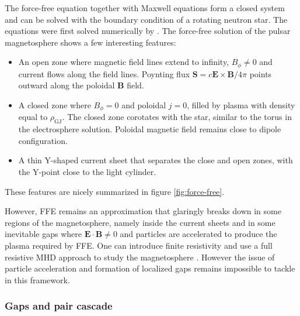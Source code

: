 The force-free equation together with Maxwell equations form a closed system
and can be solved with the boundary condition of a rotating neutron star. The
equations were first solved numerically by \citet{contopoulos_axisymmetric_1999}
\citetext{see also e.g.\ \citealp{goodwin_idealized_2004};
  \citealp{gruzinov_power_2005}; \citealp{timokhin_force-free_2006};
  \citealp{parfrey_introducing_2012}}. The force-free solution of the pulsar
magnetosphere shows a few interesting features:
\begin{itemize}
\item An open zone where magnetic field lines extend to infinity, $B_{\phi}\neq
  0$ and current flows along the field lines. Poynting flux $\mathbf{S} =
  c\mathbf{E}\times \mathbf{B}/4\pi$ points outward along the poloidal $\mathbf{B}$
  field.
\item A closed zone where $B_{\phi} = 0$ and poloidal $j=0$, filled by plasma
  with density equal to $\rho_\mathrm{GJ}$. The closed zone corotates with the
  star, similar to the torus in the electrosphere solution. Poloidal magnetic
  field remains close to dipole configuration.
\item A thin Y-shaped current sheet that separates the close and open zones,
  with the Y-point close to the light cylinder.
\end{itemize}
These features are nicely summarized in figure \ref{fig:force-free}.


However, FFE remains an approximation that glaringly breaks down in some regions
of the magnetosphere, namely inside the current sheets and in some inevitable
gaps where $\mathbf{E}\cdot \mathbf{B} \neq 0$ and particles are accelerated to
produce the plasma required by FFE. One can introduce finite resistivity and use
a full resistive MHD approach to study the magnetosphere
\citep[e.g.][]{kalapotharakos_gamma-ray_2014}%
. However the issue of particle acceleration and formation of localized gaps
remains impossible to tackle in this framework.

\subsubsection{Gaps and pair cascade}
\label{sec:gap-models}


